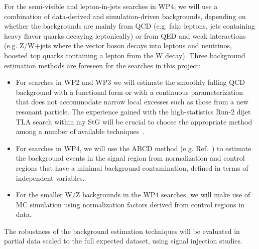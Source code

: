For the semi-visible and lepton-in-jets searches in WP4, we will use a combination of data-derived and simulation-driven backgrounds, depending on whether the backgrounds are mainly from QCD (e.g. fake leptons, jets containing heavy flavor quarks decaying leptonically) or from QED and weak interactions (e.g. Z/W+jets where the vector boson decays into leptons and neutrinos, boosted top quarks containing a lepton from the W decay). 
Three background estimation methods are foreseen for the searches in this project: 
\begin{itemize}
\item For searches in WP2 and WP3 we will estimate the smoothly falling QCD background with a functional form or with a continuous parameterization that does not accommodate narrow local excesses such as those from a new resonant particle. The experience gained with the high-statistics Run-2 dijet TLA search within my StG will be crucial to choose the appropriate method among a number of available techniques~\cite{Frate:2017mai,Aaboud:2018fzt,Edgar:2018irz}. %
\item For searches in WP4, we will use the ABCD method (e.g. Ref.~\cite{Choi:2019mip,Aaboud:2018lpl}) %
to estimate the background events in the signal region from normalization and control regions that have a minimal background contamination, defined in terms of independent variables. 
\item For the smaller W/Z backgrounds in the WP4 searches, we will make use of MC simulation using normalization factors derived from control regions in data. 
\end{itemize}
The robustness of the background estimation techniques will be evaluated in partial data scaled to the full expected dataset, using signal injection studies. 


